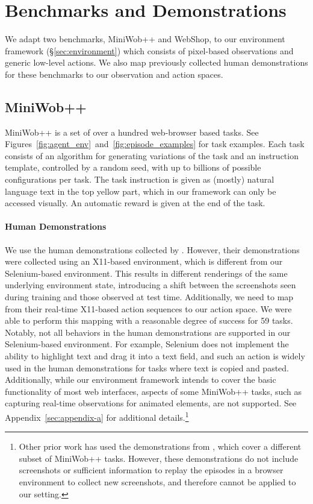 \section{Benchmarks and Demonstrations}
\label{sec:datasets}

We adapt two benchmarks, MiniWob++ and WebShop, to our environment framework (\S\ref{sec:environment}) which consists of pixel-based observations and generic low-level actions. We also map previously collected human demonstrations for these benchmarks to our observation and action spaces. 

\subsection{MiniWob++}
\label{sec:datasets-miniwob}

MiniWob++ \citep{liu2018reinforcement} is a set of over a hundred web-browser based tasks. 
See Figures~\ref{fig:agent_env}~and~\ref{fig:episode_examples} for task examples. Each task consists of an algorithm for generating variations of the task and an instruction template, controlled by a random seed, with up to billions of possible configurations per task.
The task instruction is given as (mostly) natural language text in the top yellow part, which in our framework can only be accessed visually. An automatic reward is given at the end of the task.

\paragraph{Human Demonstrations} We use the human demonstrations collected by \citet{humphreys2022data}. However, their demonstrations were collected using an X11-based environment, which is different from our Selenium-based environment. This results in different renderings of the same underlying environment state, introducing a shift between the screenshots seen during training and those observed at test time. Additionally, we need to map from their real-time X11-based action sequences to our action space. We were able to perform this mapping with a reasonable degree of success for 59 tasks. Notably, not all behaviors in the human demonstrations are supported in our Selenium-based environment. For example, Selenium does not implement the ability to highlight text and drag it into a text field, and such an action is widely used in the human demonstrations for tasks where text is copied and pasted. Additionally, while our environment framework intends to cover the basic functionality of most web interfaces, aspects of some MiniWob++ tasks, such as capturing real-time observations for animated elements, are not supported. See Appendix~\ref{sec:appendix-a} for additional details.\footnote{Other prior work has used the demonstrations from \citet{liu2018reinforcement}, which cover a different subset of MiniWob++ tasks. However, these demonstrations do not include screenshots or sufficient information to replay the episodes in a browser environment to collect new screenshots, and therefore cannot be applied to our setting.}

